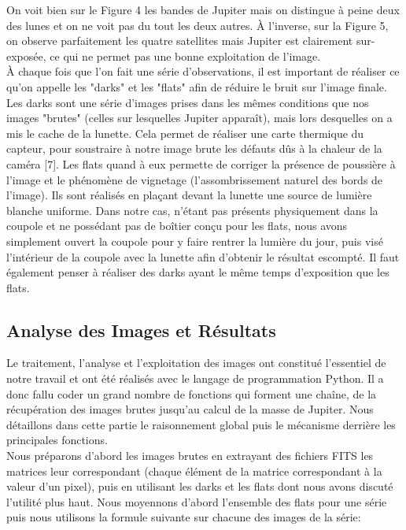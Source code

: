 \documentclass{aa}
\begin{document}
On voit bien sur le Figure 4 les bandes de Jupiter mais on distingue à peine deux des lunes et on ne voit pas du tout les deux autres. À l'inverse, sur la Figure 5, on observe parfaitement les quatre satellites mais Jupiter est clairement sur-exposée, ce qui ne permet pas une bonne exploitation de l'image.\\

À chaque fois que l'on fait une série d'observations, il est important de réaliser ce qu'on appelle les "darks" et les "flats" afin de réduire le bruit sur l'image finale.
Les darks sont une série d'images prises dans les mêmes conditions que nos images "brutes" (celles sur lesquelles Jupiter apparaît), mais lors desquelles on a mis le cache de la lunette. Cela permet de réaliser une carte thermique du capteur, pour soustraire à notre image brute les défauts dûs à la chaleur de la caméra [7]. 
Les flats quand à eux permette de corriger la présence de poussière à l'image et le phénomène de vignetage (l'assombrissement naturel des bords de l'image). Ils sont réalisés en plaçant devant la lunette une source de lumière blanche uniforme. Dans notre cas, n'étant pas présents physiquement dans la coupole et ne possédant pas de boîtier conçu pour les flats, nous avons simplement ouvert la coupole pour y faire rentrer la lumière du jour, puis visé l'intérieur de la coupole avec la lunette afin d'obtenir le résultat escompté.
Il faut également penser à réaliser des darks ayant le même temps d'exposition que les flats.



\subsection{Analyse des Images et Résultats}

Le traitement, l'analyse et l'exploitation des images ont constitué l'essentiel de notre travail et ont été réalisés avec le langage de programmation Python. Il a donc fallu coder un grand nombre de fonctions qui forment une chaîne, de la récupération des images brutes jusqu'au calcul de la masse de Jupiter. Nous détaillons dans cette partie le raisonnement global puis le mécanisme derrière les principales fonctions. \\

Nous préparons d'abord les images brutes en extrayant des fichiers FITS les matrices leur correspondant (chaque élément de la matrice correspondant à la valeur d'un pixel), puis en utilisant les darks et les flats dont nous avons discuté l'utilité plus haut. Nous moyennons d'abord l'ensemble des flats pour une série puis nous utilisons la formule suivante sur chacune des images de la série: \\
\end{document}
